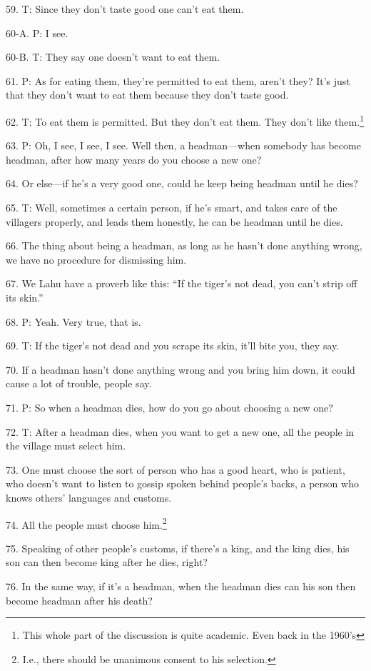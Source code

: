 59. T: Since they don't taste good one can't eat them.

60-A. P: I see.

60-B. T: They say one doesn't want to eat them.

61. P: As for eating them, they're permitted to eat them, aren't they? It's just
that they don't want to eat them because they don't taste good.

62. T: To eat them is permitted. But they don't eat them. They don't like them.\footnote{This whole part of the discussion is quite academic. Even back in the 1960's}

63. P: Oh, I see, I see, I see. Well then, a headman---when somebody has become
headman, after how many years do you choose a new one?

64. Or else---if he's a very good one, could he keep being headman until he dies?

65. T: Well, sometimes a certain person, if he's smart, and takes care of the villagers
properly, and leads them honestly, he can be headman until he dies.

66. The thing about being a headman, as long as he hasn't done anything wrong,
we have no procedure for dismissing him.

67. We Lahu have a proverb like this: ``If the tiger's not dead, you can't strip
off its skin.''

68. P: Yeah. Very true, that is.

69. T: If the tiger's not dead and you scrape its skin, it'll bite you, they say.

70. If a headman hasn't done anything wrong and you bring him down, it could cause
a lot of trouble, people say.

71. P: So when a headman dies, how do you go about choosing a new one?

72. T: After a headman dies, when you want to get a new one, all the people in
the village must select him.

73. One must choose the sort of person who has a good heart, who is patient, who
doesn't want to listen to gossip spoken behind people's backs, a person who knows
others' languages and customs.

74. All the people must choose him.\footnote{I.e., there should be unanimous consent to his selection.}

75. Speaking of other people's customs, if there's a king, and the king dies, his
son can then become king after he dies, right?

76. In the same way, if it's a headman, when the headman dies can his son then
become headman after his death?

